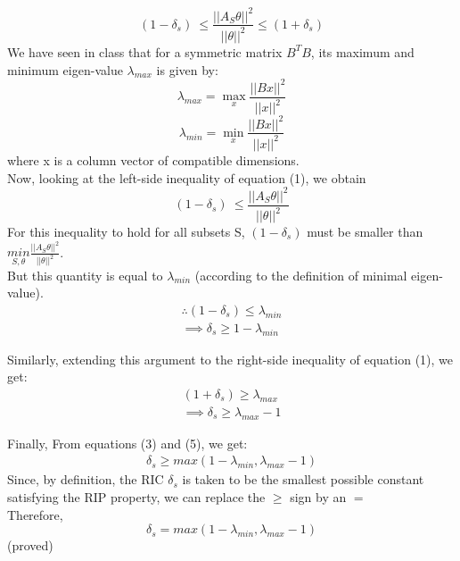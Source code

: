 \documentclass{article}
\begin{document}
\begin{enumerate}
        \begin{equation}
            (1-\delta_s )\ \leq \frac{||A_{S} \theta||^{2}}{||\theta||^{2}} \leq (1+\delta_s)
        \end{equation}
        We have seen in class that for a symmetric matrix $B^{T}B$, its maximum and minimum eigen-value $\lambda_{max}$ is given by:
        \[
            \lambda_{max} = \underset{x}{\max}  \frac{||Bx||^2}{||x||^2}
        \]
        \[
            \lambda_{min} = \underset{x}{\min}  \frac{||Bx||^2}{||x||^2}
        \]
        where x is a column vector of compatible dimensions.\\

        \vspace{2em}
        Now, looking at the left-side inequality of equation (1), we obtain
        \[ 
            (1-\delta_s )\ \leq \frac{||A_{S} \theta||^{2}}{||\theta||^{2}}
        \]
        For this inequality to hold for all subsets S, $(1-\delta_s)$ must be smaller than $\underset{S, \theta}{min} \frac{||A_{S} \theta||^{2}}{||\theta||^{2}}$. \\
        But this quantity is equal to $\lambda_{min}$ (according to the definition of minimal eigen-value).\\

        \begin{align}
        \therefore (1-\delta_s) \leq \lambda_{min}\\
        \implies \delta_s \geq 1-\lambda_{min}
        \end{align}
        
        Similarly, extending this argument to the right-side inequality of equation (1), we get:
        \begin{align}
        (1+\delta_s) \geq \lambda_{max}\\
        \implies \delta_s \geq \lambda_{max} -1
        \end{align}

        Finally, From equations (3) and (5), we get:
        \begin{align}
            \delta_s \geq max(1-\lambda_{min}, \lambda_{max}-1)
        \end{align}
        Since, by definition, the RIC $\delta_s$ is taken to be the smallest possible constant satisfying the RIP property, we can replace the $\geq$ sign by an $=$\\
        Therefore, 
        \begin{equation}
                 \delta_s = max(1-\lambda_{min}, \lambda_{max}-1)
        \end{equation}
        (proved)
        
        
\end{enumerate}
\end{document}
